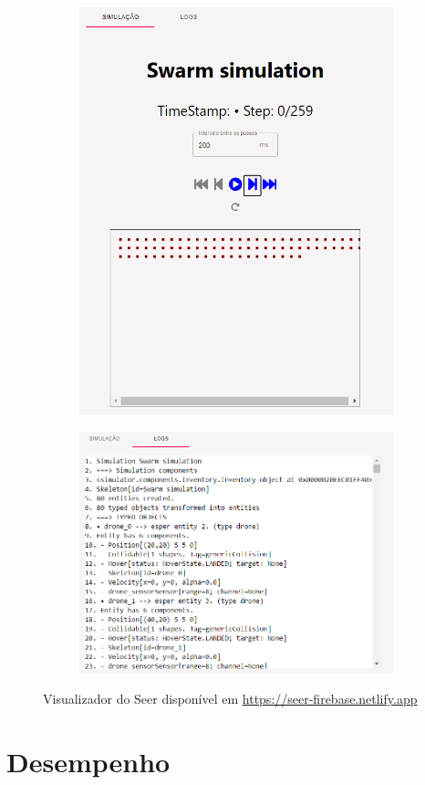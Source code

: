 \begin{figure}
    \centering
    \begin{subfigure}[b]{0.4\textwidth}
        \includegraphics[width=\textwidth]{img/seer_simulation.png}
    \end{subfigure}
    \hfill
    \begin{subfigure}[b]{0.5\textwidth}
        \includegraphics[width=\textwidth]{img/seer_logs.png}
    \end{subfigure}
    \caption{Visualizador do Seer disponível em \url{https://seer-firebase.netlify.app}}
    \label{fig:dullens_big_contribution}
\end{figure}

\section{Desempenho}
\label{sec:performance}